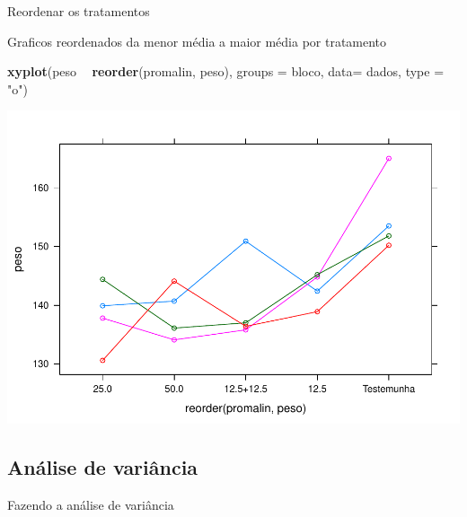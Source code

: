 \documentclass[
]{book}
\newenvironment{Shaded}{\begin{snugshade}}{\end{snugshade}}
\newcommand{\DataTypeTok}[1]{\textcolor[rgb]{0.13,0.29,0.53}{#1}}
\newcommand{\KeywordTok}[1]{\textcolor[rgb]{0.13,0.29,0.53}{\textbf{#1}}}
\newcommand{\NormalTok}[1]{#1}
\newcommand{\OperatorTok}[1]{\textcolor[rgb]{0.81,0.36,0.00}{\textbf{#1}}}
\newcommand{\StringTok}[1]{\textcolor[rgb]{0.31,0.60,0.02}{#1}}
\begin{document}
Reordenar os tratamentos

\begin{Shaded}
\end{Shaded}

Graficos reordenados da menor média a maior média por tratamento

\begin{Shaded}
\begin{Highlighting}[]
\KeywordTok{xyplot}\NormalTok{(peso }\OperatorTok{~}\StringTok{ }\KeywordTok{reorder}\NormalTok{(promalin, peso), }
        \DataTypeTok{groups =}\NormalTok{ bloco, }
        \DataTypeTok{data=}\NormalTok{ dados,}
        \DataTypeTok{type =} \StringTok{"o"}\NormalTok{)}
\end{Highlighting}
\end{Shaded}

\includegraphics{TudodoR_files/figure-latex/unnamed-chunk-284-1.pdf}

\hypertarget{anuxe1lise-de-variuxe2ncia}{%
\subsection{Análise de variância}\label{anuxe1lise-de-variuxe2ncia}}

Fazendo a análise de variância
\end{document}
